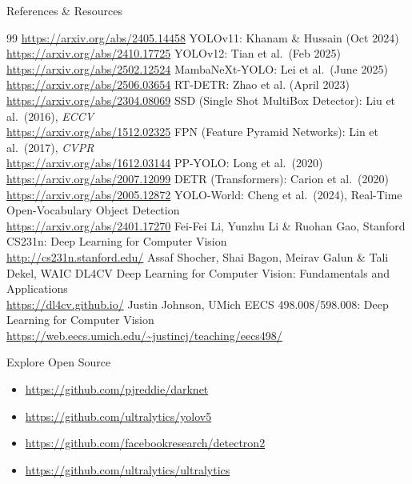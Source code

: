 \begin{frame}[allowframebreaks]{References \& Resources}
\begin{thebibliography}{99}
            \url{https://arxiv.org/abs/2405.14458}
            YOLOv11: Khanam \& Hussain (Oct 2024) \\
            \url{https://arxiv.org/abs/2410.17725}
            YOLOv12: Tian et al.\ (Feb 2025) \\
            \url{https://arxiv.org/abs/2502.12524}
            MambaNeXt-YOLO: Lei et al.\ (June 2025) \\
            \url{https://arxiv.org/abs/2506.03654}
            RT-DETR: Zhao et al. (April 2023) \\
            \url{https://arxiv.org/abs/2304.08069}
            SSD (Single Shot MultiBox Detector): Liu et al.\ (2016), \emph{ECCV} \\
            \url{https://arxiv.org/abs/1512.02325}
            FPN (Feature Pyramid Networks): Lin et al.\ (2017), \emph{CVPR} \\
            \url{https://arxiv.org/abs/1612.03144}
            PP-YOLO: Long et al.\ (2020) \\
            \url{https://arxiv.org/abs/2007.12099}
            DETR (Transformers): Carion et al.\ (2020) \\
            \url{https://arxiv.org/abs/2005.12872}
            YOLO-World: Cheng et al.\ (2024), Real-Time Open-Vocabulary Object Detection \\
            \url{https://arxiv.org/abs/2401.17270}
            Fei-Fei Li, Yunzhu Li \& Ruohan Gao, Stanford CS231n: Deep Learning for Computer Vision \\
            \url{http://cs231n.stanford.edu/}
            Assaf Shocher, Shai Bagon, Meirav Galun \& Tali Dekel, WAIC DL4CV Deep Learning for Computer Vision: Fundamentals and Applications \\
            \url{https://dl4cv.github.io/}
            Justin Johnson, UMich EECS 498.008/598.008: Deep Learning for Computer Vision \\
            \url{https://web.eecs.umich.edu/~justincj/teaching/eecs498/}
    \end{thebibliography}
\end{frame}

\begin{frame}{Explore Open Source}
    \begin{itemize}
        \item \url{https://github.com/pjreddie/darknet}
        \item \url{https://github.com/ultralytics/yolov5}
        \item \url{https://github.com/facebookresearch/detectron2}
        \item \url{https://github.com/ultralytics/ultralytics}
    \end{itemize}
\end{frame}

